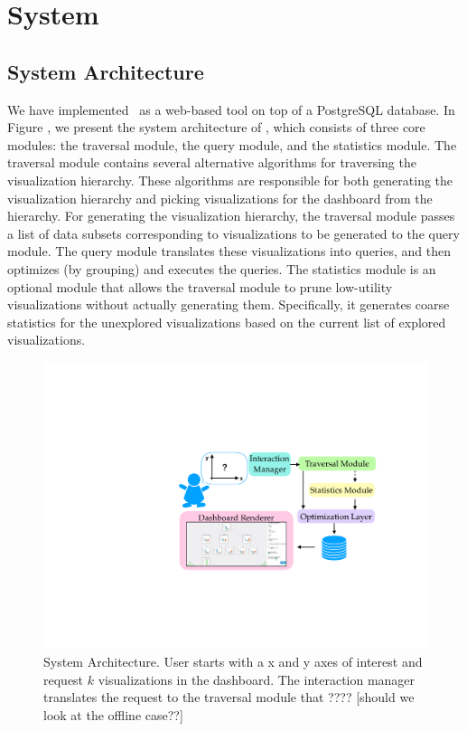 \section{System}
\subsection{System Architecture}
We have implemented \system\ as a web-based tool on top of a PostgreSQL database. In Figure \label{system_architecture}, we present the system architecture of \system, which consists of three core modules: the traversal module, the query module, and the statistics module. The traversal module contains several alternative algorithms for traversing the visualization hierarchy. These algorithms are responsible for both generating the visualization hierarchy and picking visualizations for the dashboard from the hierarchy. For generating the visualization hierarchy, the traversal module passes a list of data subsets corresponding to visualizations to be generated to the query module. The query module translates these visualizations into queries, and then optimizes (by grouping) and executes the queries. The statistics module is an optional module that allows the traversal module to prune low-utility visualizations without actually generating them. Specifically, it generates coarse statistics for the unexplored visualizations based on the current list of explored visualizations. 
\begin{figure}[ht!]
\centering
\includegraphics[width=\linewidth]{figures/system_architecture.pdf}
\caption{System Architecture. User starts with a x and y axes of interest and request $k$ visualizations in the dashboard. The interaction manager translates the request to the traversal module that ???? [should we look at the offline case??]}
\label{system_architecture}
\end{figure}

